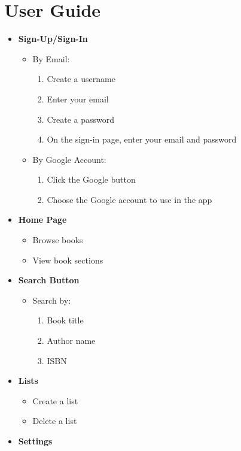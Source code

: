 \documentclass{article}
\begin{document}
\section*{User Guide}
\begin{itemize}
    \item \textbf{Sign-Up/Sign-In}
    \begin{itemize}
        \item By Email:
        \begin{enumerate}
            \item Create a username
            \item Enter your email
            \item Create a password
            \item On the sign-in page, enter your email and password
        \end{enumerate}
        \item By Google Account:
        \begin{enumerate}
            \item Click the Google button
            \item Choose the Google account to use in the app
        \end{enumerate}
    \end{itemize}
    \item \textbf{Home Page}
    \begin{itemize}
        \item Browse books
        \item View book sections
    \end{itemize}
    \item \textbf{Search Button}
    \begin{itemize}
        \item Search by:
        \begin{enumerate}
            \item Book title
            \item Author name
            \item ISBN
        \end{enumerate}
    \end{itemize}
    \item \textbf{Lists}
    \begin{itemize}
        \item Create a list
        \item Delete a list
    \end{itemize}
    \item \textbf{Settings}
\end{itemize}
\end{document}
